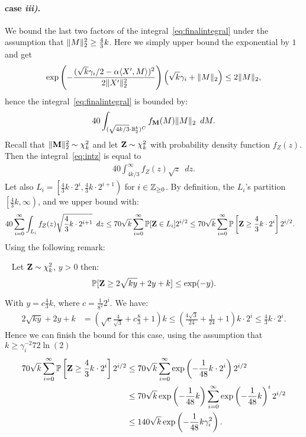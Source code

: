 \paragraph{case \textit{iii)}.}
We bound the last two factors of the integral~\eqref{eq:finalintegral} under the assumption that $\norm{M}_2^2\ge \frac{4}{3}k$. Here we simply upper bound the exponential by $1$ and get
\begin{align*}
\exp\left(-\frac{(\sqrt{k}\gamma_i/2 - \alpha\ipr{X',M})^2}{2\norm{X'}_2^2}\right)\left(\sqrt{k}\gamma_i + \|M\|_2 \right)
\le 2\norm{M}_2,
\end{align*}
hence the integral~\eqref{eq:finalintegral} is bounded by:
\begin{align}
40 \int_{(\sqrt{4 k/3} \cdot \Ball_2^k)^C} f_{\rM}(M)\norm{M}_2 \enspace dM \label{eq:intz}.
\end{align}
Recall that $\norm{\rM}_2^2\sim\chi_k^2$ and let $\mathbf{Z}\sim \chi_k^2$ with probability density function $f_Z(z)$. Then the integral~\eqref{eq:intz} is equal to
\begin{align*}
    40\int_{4k/3}^\infty f_{Z}(z)\sqrt{z} \enspace dz.
\end{align*}
Let also $L_i = \left[\frac{4}{3}k\cdot2^{i}, \frac{4}{3}k\cdot2^{i+1} \right)$  for $i\in\mathbb{Z}_{\ge0}$. By definition, the $L_i$'s partition $\left[\frac{4}{3}k,\infty\right)$, and we upper bound with: 
\begin{align*}
    40\sum_{i=0}^\infty \int_{L_i} f_{Z}(z)\sqrt{\frac{4}{3}k\cdot2^{i+1}} \enspace dz
    &\le 70 \sqrt{k}\sum_{i=0}^\infty \mathbb{P}[\mathbf{Z}\in L_i] 2^{i/2}
    \le 70 \sqrt{k} \sum_{i=0}^\infty \mathbb{P}\left[\mathbf{Z}\ge \frac{4}{3}k\cdot2^{i}\right] 2^{i/2}.
\end{align*}
Using the following remark:
\begin{remark}\ \newline
    Let $\mathbf{Z}\sim \chi^2_k$, $y > 0$ then:
    $$\mathbb{P}[\mathbf{Z}\ge2\sqrt{ky}+2y+k]\le \exp(-y).$$
\end{remark}
With $y= c\frac{4}{3} k$, where $c = \frac{1}{8^2}2^i$. We have: 
\begin{align*}
    2\sqrt{ky}+2y+k 
    &= \left(\sqrt{c}\frac{4}{\sqrt{3}}+c\frac{8}{3}+1\right)k
    \le \left(\frac{4\sqrt{3}}{24}+\frac{1}{24}+1\right)k\cdot 2^i
    \le \frac{4}{3}k\cdot 2^i.
\end{align*}
Hence we can finish the bound for this case, using the assumption that $k\ge \gamma_i^{-2} 72 \ln(2)$
\begin{align*}
    70\sqrt{k} \sum_{i=0}^\infty \mathbb{P}\left[\mathbf{Z}\ge \frac{4}{3}k\cdot2^{i}\right] 2^{i/2}
    &\le70\sqrt{k} \sum_{i=0}^\infty \exp\left(-\frac{1}{48} k \cdot 2^i\right) 2^{i/2}\\
    &\le70\sqrt{k}\exp\left(-\frac{1}{48} k\right) \sum_{i=0}^\infty \exp\left(-\frac{1}{48} k \right)^{i} 2^{i/2}\\
    &\le140\sqrt{k}\exp\left(-\frac{1}{48} k\gamma_i^2\right).
\end{align*}

